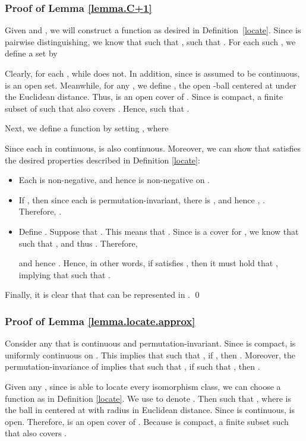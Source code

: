\documentclass{article}
\begin{document}
\subsubsection{Proof of Lemma \ref{lemma.C+1}}
Given  and , we will construct a function  as desired in Definition~\ref{locate}. Since  is pairwise distinguishing, we know that  such that ,  such that . For each such , we define a set  by

Clearly, for each ,  while  does not. In addition, since  is assumed to be continuous,  is an open set. Meanwhile, for any , we define , the open -ball centered at  under the Euclidean distance. Thus,  is an open cover of . Since  is compact,  a finite subset  of  such that  also covers . 
Hence,  such that . 

Next, we define a function  by setting , where 

Since each  in continuous,  is also continuous. Moreover, we can show that  satisfies the desired properties described in Definition \ref{locate}:
\begin{itemize}
    \item Each  is non-negative, and hence  is non-negative on .
    \item If , then since each  is permutation-invariant, there is , and hence , . Therefore, .
    \item Define .
    Suppose that . This means that . Since  is a cover for , we know that 
     such that , and thus . Therefore, 
    
    and hence .
    Hence, in other words, if  satisfies , then it must hold that , implying that  such that .
\end{itemize}
Finally, it is clear that that  can be represented in . \qed

\subsubsection{Proof of Lemma \ref{lemma.locate.approx}}
Consider any  that is continuous and permutation-invariant. Since  is compact,  is uniformly continuous on . This implies that  such that , if , then . Moreover, the permutation-invariance of  implies that  such that , if  such that , then .

Given any , since  is able to locate every isomorphism class, we can choose a function  as in Definition \ref{locate}. We use  to denote . Then  such that , where  is the ball in  centered at  with radius  in Euclidean distance. Since  is continuous,  is open. Therefore,  is an open cover of . Because  is compact,  a finite subset  such that  also covers .
\end{document}

